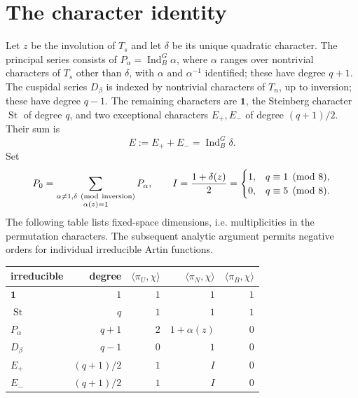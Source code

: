 \documentclass[11pt]{article}
\theoremstyle{remark}\newtheorem{remark}[theorem]{Remark}
\newcommand{\Ind}{\operatorname{Ind}}
\newcommand{\St}{\operatorname{St}}
\newcommand{\one}{\mathbf 1}
\begin{document}
\section{The character identity}
Let $z$ be the involution of $T_s$ and let $\delta$ be its unique quadratic
character. The principal series consists of
$P_\alpha=\Ind_B^G\alpha$, where $\alpha$ ranges over nontrivial
characters of $T_s$ other than $\delta$, with $\alpha$ and $\alpha^{-1}$
identified; these have degree $q+1$. The cuspidal series $D_\beta$ is
indexed by nontrivial characters of $T_n$, up to inversion; these have
degree $q-1$. The remaining characters are $\one$, the Steinberg character
$\St$ of degree $q$, and two exceptional characters $E_+,E_-$ of degree
$(q+1)/2$. Their sum is
\[
 E:=E_++E_-=\Ind_B^G\delta.
\]
Set
\[
 P_0=\sum_{\substack{\alpha\ne1,\delta\ ({\rm mod\ inversion})\\
                         \alpha(z)=1}}P_\alpha,
 \qquad
 I=\frac{1+\delta(z)}2=
 \begin{cases}1,&q\equiv1\pmod8,\\0,&q\equiv5\pmod8.\end{cases}
\]
The following table lists fixed-space dimensions, i.e. multiplicities in
the permutation characters. The subsequent analytic argument permits
negative orders for individual irreducible Artin functions.
\begin{center}
\begin{tabular}{@{}lrrrr@{}}\toprule
irreducible & degree & $\langle\pi_U,\chi\rangle$
 & $\langle\pi_N,\chi\rangle$ & $\langle\pi_B,\chi\rangle$\\\midrule
$\one$ & $1$ & $1$ & $1$ & $1$\\
$\St$ & $q$ & $1$ & $1$ & $1$\\
$P_\alpha$ & $q+1$ & $2$ & $1+\alpha(z)$ & $0$\\
$D_\beta$ & $q-1$ & $0$ & $1$ & $0$\\
$E_+$ & $(q+1)/2$ & $1$ & $I$ & $0$\\
$E_-$ & $(q+1)/2$ & $1$ & $I$ & $0$\\\bottomrule
\end{tabular}
\end{center}
\end{document}
